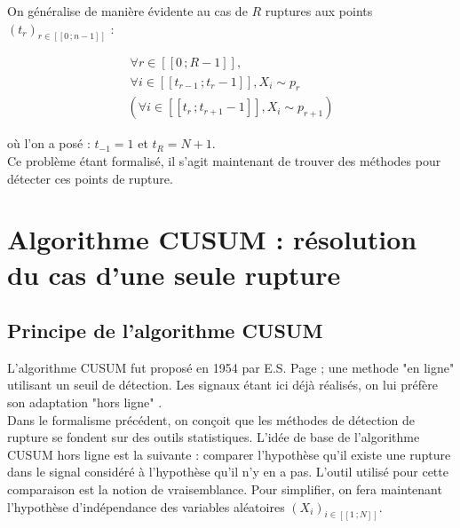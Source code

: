 \documentclass[french,11pt,notitlepage]{report}
\begin{document}
	On généralise de manière évidente au cas de $R$ ruptures aux points $(t_r)_{r \in [\![0\,; n-1]\!]}$ :
	
	\begin{equation}
	\begin{array}{lll}
		~ \forall r \in [\![0\,; R-1]\!], \\
		~ \forall i \in [\![t_{r-1}\,; t_r-1]\!], X_i \sim p_r \\
		( \forall i \in [\![t_r\,; t_{r+1}-1]\!], X_i \sim p_{r+1} )
	\end{array}
	\label{multi_rupt}
	\end{equation}
	
	où l'on a posé : $t_{-1} = 1$ et $t_R = N+1$.
	\\
	
	Ce problème étant formalisé, il s'agit maintenant de trouver des méthodes pour détecter ces points de rupture.
	
	
	
	\chapter{Algorithme CUSUM : résolution du cas d'une seule rupture}
	
	
	
	\section{Principe de l'algorithme CUSUM}
	
	
	L'algorithme CUSUM fut proposé en 1954 par E.S. Page \cite{CIS} ; une methode "en ligne" utilisant un seuil de détection.
	Les signaux étant ici déjà réalisés, on lui préfère son adaptation "hors ligne" \cite{DAC}.
	\\
	
	Dans le formalisme précédent, on conçoit que les méthodes de détection de rupture se fondent sur des outils statistiques.
	L'idée de base de l'algorithme CUSUM hors ligne est la suivante :
	comparer l'hypothèse qu'il existe une rupture dans le signal considéré à l'hypothèse qu'il n'y en a pas.
	L'outil utilisé pour cette comparaison est la notion de vraisemblance.
	Pour simplifier, on fera maintenant l'hypothèse d'indépendance des variables aléatoires $(X_i)_{i \in [\![1\,; N]\!]}$.
	\\
	
\end{document}
